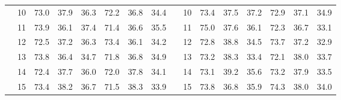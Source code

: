 \begin{table}[p]
{\begin{tabular}{c c | c c c | c c c || c c | c c c | c c c}
             & 10 & 73.0 & 37.9 & 36.3 & 72.2 & 36.8 & 34.4 &  & 10 & 73.4 & 37.5 & 37.2 & 72.9 & 37.1 & 34.9 \\
             & 11 & 73.9 & 36.1 & 37.4 & 71.4 & 36.6 & 35.5 &  & 11 & 75.0 & 37.6 & 36.1 & 72.3 & 36.7 & 33.1 \\
             & 12 & 72.5 & 37.2 & 36.3 & 73.4 & 36.1 & 34.2 &  & 12 & 72.8 & 38.8 & 34.5 & 73.7 & 37.2 & 32.9 \\
             & 13 & 73.8 & 36.4 & 34.7 & 71.8 & 36.8 & 34.9 &  & 13 & 73.2 & 38.3 & 33.4 & 72.1 & 38.0 & 33.7 \\
             & 14 & 72.4 & 37.7 & 36.0 & 72.0 & 37.8 & 34.1 &  & 14 & 73.1 & 39.2 & 35.6 & 73.2 & 37.9 & 33.5 \\
             & 15 & 73.4 & 38.2 & 36.7 & 71.5 & 38.3 & 33.9 &  & 15 & 73.8 & 36.8 & 35.9 & 74.3 & 38.0 & 34.0 \\
    \bottomrule
\end{tabular}%
}
\label{tab:duration_all_group}
\end{table}

